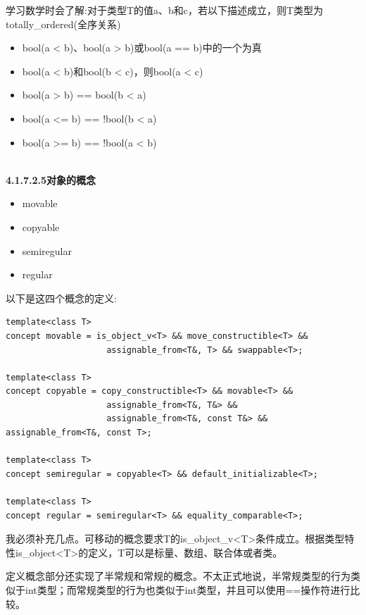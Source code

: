 学习数学时会了解:对于类型T的值a、b和c，若以下描述成立，则T类型为totally\_ordered(全序关系)

\begin{itemize}
\item
bool(a < b)、bool(a > b)或bool(a == b)中的一个为真

\item
bool(a < b)和bool(b < c)，则bool(a < c)

\item
bool(a > b) == bool(b < a)

\item
bool(a <= b) == !bool(b < a)

\item
bool(a >= b) == !bool(a < b)
\end{itemize}

\hspace*{\fill} \\ %
\noindent
\textbf{4.1.7.2.5\hspace{0.2cm}对象的概念}

\begin{itemize}
\item
movable

\item
copyable

\item
semiregular

\item
regular
\end{itemize}

以下是这四个概念的定义:

\begin{lstlisting}[style=styleCXX]
template<class T>
concept movable = is_object_v<T> && move_constructible<T> &&
					assignable_from<T&, T> && swappable<T>;

template<class T>
concept copyable = copy_constructible<T> && movable<T> &&
					assignable_from<T&, T&> &&
					assignable_from<T&, const T&> && assignable_from<T&, const T>;

template<class T>
concept semiregular = copyable<T> && default_initializable<T>;

template<class T>
concept regular = semiregular<T> && equality_comparable<T>;
\end{lstlisting}

我必须补充几点。可移动的概念要求T的is\_object\_v<T>条件成立。根据类型特性is\_object<T>的定义，T可以是标量、数组、联合体或者类。

定义概念部分还实现了半常规和常规的概念。不太正式地说，半常规类型的行为类似于int类型；而常规类型的行为也类似于int类型，并且可以使用==操作符进行比较。

